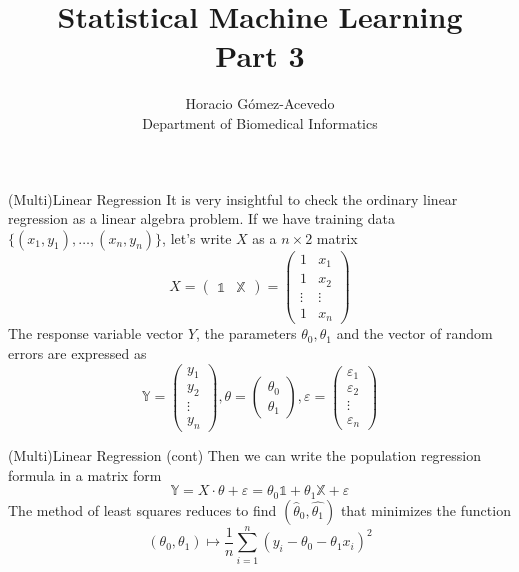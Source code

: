 \documentclass{beamer}
\title{Statistical Machine Learning\\ Part 3}
\author{Horacio G\'omez-Acevedo\\ Department of Biomedical Informatics}
\begin{document}
	\begin{frame}[plain]
		\maketitle
	\end{frame}
	\begin{frame}{(Multi)Linear Regression }
		It is very insightful to check the ordinary linear regression as a
		linear algebra problem.
		If we have training data \(\{ (x_1,y_1),\ldots,(x_n,y_n)\}\), let's
		write \(X\) as a \(n\times 2\) matrix 
		\begin{equation*}
		X= \begin{pmatrix}
			\mathbb{1} & \mathbb{X }
		\end{pmatrix}=
		\begin{pmatrix}
			1 & x_1\\
			1 & x_2 \\
		   	\vdots & \vdots \\
			1 & x_n 
		\end{pmatrix}
		\end{equation*} The response variable vector \(Y\), the parameters
		\(\theta_0, \theta_1\) and the vector of random errors are expressed as
		\begin{equation*}
		\mathbb{Y}=
		\begin{pmatrix}
			y_1\\
			y_2\\
			\vdots\\
			y_n
		\end{pmatrix},
		\theta= 
		\begin{pmatrix}
			\theta_0 \\
			\theta_1
		\end{pmatrix}, 
		\varepsilon= 
		\begin{pmatrix}
			\varepsilon_1\\
			\varepsilon_2\\
			\vdots\\
			\varepsilon_n
		\end{pmatrix}
		\end{equation*} 
	\end{frame}

\begin{frame}{(Multi)Linear Regression (cont)}
	Then we can write the population regression formula in a matrix form
\begin{equation}
	\mathbb{Y}=X \cdot \theta + \varepsilon=\theta_0 \mathbb{1}+ \theta_1 \mathbb{X}+ \varepsilon
\end{equation}
The method of least squares reduces to find $(\hat{\theta}_0,\hat{\theta_1})$ that minimizes the function
	\begin{equation*}
		(\theta_0,\theta_1)\mapsto \frac{1}{n}\sum_{i=1}^n (y_i- \theta_0-\theta_1 x_i)^2
	\end{equation*}
\end{frame}
\end{document}
